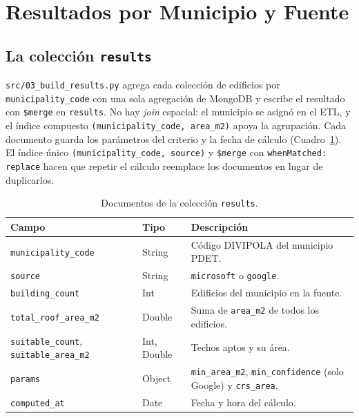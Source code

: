 \section{Resultados por Municipio y Fuente}\label{sec:resultados}

\subsection{La colección \texttt{results}}
\texttt{src/03\_build\_results.py} agrega cada colección de edificios por \texttt{municipality\_code} con una sola agregación de MongoDB y escribe el resultado con \texttt{\$merge} en \texttt{results}. No hay \emph{join} espacial: el municipio se asignó en el ETL, y el índice compuesto \texttt{(municipality\_code, area\_m2)} apoya la agrupación. Cada documento guarda los parámetros del criterio y la fecha de cálculo (Cuadro~\ref{tab:dic_results}). El índice único \texttt{(municipality\_code, source)} y \texttt{\$merge} con \texttt{whenMatched: replace} hacen que repetir el cálculo reemplace los documentos en lugar de duplicarlos.

\begin{table}[H]
\centering
\small
{}
\begin{tabularx}{\textwidth}{l l X}
\toprule
\textbf{Campo} & \textbf{Tipo} & \textbf{Descripción} \\
\midrule
\texttt{municipality\_code} & String & Código DIVIPOLA del municipio PDET. \\
\texttt{source} & String & \texttt{microsoft} o \texttt{google}. \\
\texttt{building\_count} & Int & Edificios del municipio en la fuente. \\
\texttt{total\_roof\_area\_m2} & Double & Suma de \texttt{area\_m2} de todos los edificios. \\
\texttt{suitable\_count}, \texttt{suitable\_area\_m2} & Int, Double & Techos aptos y su área. \\
\texttt{params} & Object & \texttt{min\_area\_m2}, \texttt{min\_confidence} (solo Google) y \texttt{crs\_area}. \\
\texttt{computed\_at} & Date & Fecha y hora del cálculo. \\
\bottomrule
\end{tabularx}
\caption{Documentos de la colección \texttt{results}.}
\label{tab:dic_results}
\end{table}

